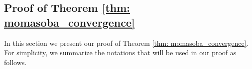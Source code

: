\documentclass[10pt]{article}
\theoremstyle{remark}
\DeclareMathOperator{\sgn}{sgn}
\begin{document}
\subsection{Proof of Theorem \ref{thm: momasoba_convergence}}\label{sec: thm2proof}
In this section we present our proof of Theorem \ref{thm: momasoba_convergence}. For simplicity, we summarize the notations that will be used in our proof as follows.
\end{document}
